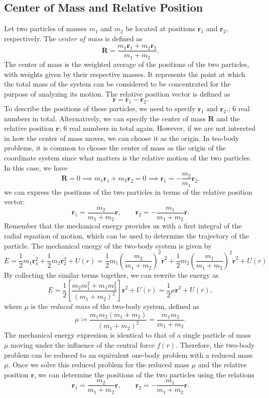 \documentclass[12pt]{article}
\begin{document}
\subsection{Center of Mass and Relative Position}
Let two particles of masses $m_1$ and $m_2$ be located at positions $\mathbf{r}_1$ and $\mathbf{r}_2$, respectively. The \emph{center of mass} is defined as
\[
    \mathbf{R} = \frac{m_1\mathbf{r}_1 + m_2\mathbf{r}_2}{m_1 + m_2}.
\]
The center of mass is the weighted average of the positions of the two particles, with weights given by their respective masses. It represents the point at which the total mass of the system can be considered to be concentrated for the purpose of analyzing its motion. The relative position vector is defined as
    \[
        \mathbf{r} = \mathbf{r}_1 - \mathbf{r}_2.
    \]
To describe the positions of these particles, we need to specify $\mathbf{r}_1 \text{ and } \mathbf{r}_2.$; $6$ real numbers in total. Alternatively, we can specify the center of mass $\mathbf{R}$ and the relative position $\mathbf{r}$; $6$ real numbers in total again. However, if we are not intereted in how the center of mass moves, we can choose it as the origin. In teo-body problems, it is common to choose the center of mass as the origin of the coordinate system since what matters is the relative motion of the two particles. In this case, we have
\[
    \mathbf{R} = 0 \implies m_1\mathbf{r}_1 + m_2\mathbf{r}_2 = 0 \implies \mathbf{r}_1 = -\frac{m_2}{m_1}\mathbf{r}_2.
\]
we can express the positions of the two particles in terms of the relative position vector:
\[
    \mathbf{r}_1 = \frac{m_2}{m_1 + m_2}\mathbf{r}, \qquad
    \mathbf{r}_2 = -\frac{m_1}{m_1 + m_2}\mathbf{r}. 
\]
Remember that the mechanical energy provides us with a first integral of the radial equation of motion, which can be used to determine the trajectory of the particle. The mechanical energy of the two-body system is given by
\[
    E = \frac{1}{2}m_1\dot{\mathbf{r}_1^2} + \frac{1}{2}m_2\dot{\mathbf{r}_2^2} + U(r) = \frac{1}{2}m_1\left(\frac{m_2}{m_1 + m_2}\right)^2\dot{\mathbf{r}}^2 + \frac{1}{2}m_2\left(\frac{m_1}{m_1 + m_2}\right)^2\dot{\mathbf{r}}^2 + U(r)
\]
By collecting the similar terms together, we can rewrite the energy as
\[
    E = \frac{1}{2}\left[\frac{m_2m_1^2+m_1m_2^2}{(m_1 + m_2)^2}\right]\dot{\mathbf{r}}^2 + U(r) = \frac{1}{2}\mu\dot{\mathbf{r}}^2 + U(r),
\]
where $\mu$ is the \emph{reduced mass} of the two-body system, defined as
\[
    \mu \coloneqq \frac{m_1m_2(m_1+m_2)}{(m_1 + m_2)^2} = \frac{m_1m_2}{m_1 + m_2}.
\]
The mechanical energy expresiion is identical to that of a single particle of mass $\mu$ moving under the influence of the central force $f(r)$. Therefore, the two-body problem can be reduced to an equivalent one-body problem with a reduced mass $\mu$. Once we solve this reduced problem for the reduced mass $\mu$ and the relative position $\mathbf{r}$, we can determine the positions of the two particles using the relations
\[
    \mathbf{r}_1 = \frac{m_2}{m_1 + m_2}\mathbf{r}, \qquad
    \mathbf{r}_2 = -\frac{m_1}{m_1 + m_2}\mathbf{r}.   
\]
\end{document}

